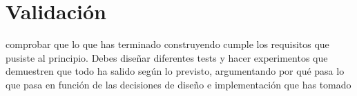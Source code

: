 \chapter{Validación}
{\color{red}comprobar que lo que has terminado construyendo cumple los requisitos que pusiste al principio. Debes diseñar diferentes tests y hacer experimentos que demuestren que todo ha salido según lo previsto, argumentando por qué pasa lo que pasa en función de las decisiones de diseño e implementación que has tomado}